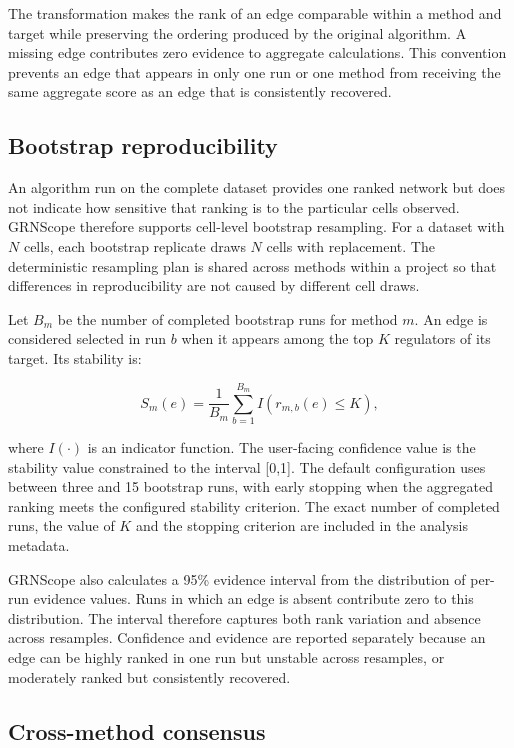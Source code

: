 \documentclass[unnumsec,webpdf,modern,large]{oup-authoring-template}%
\begin{document}
The transformation makes the rank of an edge comparable within a method and target while preserving the ordering produced by the original algorithm. A missing edge contributes zero evidence to aggregate calculations. This convention prevents an edge that appears in only one run or one method from receiving the same aggregate score as an edge that is consistently recovered.

\subsection{Bootstrap reproducibility}

An algorithm run on the complete dataset provides one ranked network but does not indicate how sensitive that ranking is to the particular cells observed. GRNScope therefore supports cell-level bootstrap resampling. For a dataset with $N$ cells, each bootstrap replicate draws $N$ cells with replacement. The deterministic resampling plan is shared across methods within a project so that differences in reproducibility are not caused by different cell draws.

Let $B_m$ be the number of completed bootstrap runs for method $m$. An edge is considered selected in run $b$ when it appears among the top $K$ regulators of its target. Its stability is:

\begin{equation}
S_m(e)=\frac{1}{B_m}\sum_{b=1}^{B_m}I(r_{m,b}(e)\leq K),
\end{equation}

where $I(\cdot)$ is an indicator function. The user-facing confidence value is the stability value constrained to the interval [0,1]. The default configuration uses between three and 15 bootstrap runs, with early stopping when the aggregated ranking meets the configured stability criterion. The exact number of completed runs, the value of $K$ and the stopping criterion are included in the analysis metadata.

GRNScope also calculates a 95\% evidence interval from the distribution of per-run evidence values. Runs in which an edge is absent contribute zero to this distribution. The interval therefore captures both rank variation and absence across resamples. Confidence and evidence are reported separately because an edge can be highly ranked in one run but unstable across resamples, or moderately ranked but consistently recovered.

\subsection{Cross-method consensus}
\end{document}
